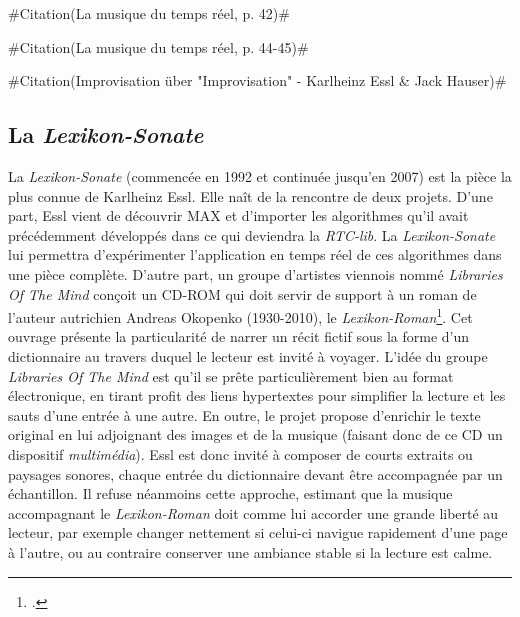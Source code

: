 \documentclass[a4paper,12pt]{article}
\newcommand{\zitat}[2]{\#Citation(#2)\#}
\begin{document}
\zitat{En musique, on parle de temps réel à partir du moment où le laps de temps entre le début du calcul et la livraison du résultat d'une opération informatique est suffisamment bref pour ne pas être perçu.}
{La musique du temps réel, p. 42}

\zitat{Le grand avantage du temps réel, ce n'est pas un gain de temps pour le compositeur --- au contraire cela représente une difficulté supplémentaire à maîtriser --- mais c'est qu'il intègre l'interprétation dans la musique électronique ; auparavant ces deux domaines restaient étrangers l'un à l'autre.}
{La musique du temps réel, p. 44-45}

\zitat{Weil man sich beim Improvisieren nicht (wie beim Komponieren) "out of time" befindet, sondern mitten im Zeitablauf steckt, entstehen aus dieser Verantwortung und aus diesem Zwang heraus Situationen, die man als Komponist am Schreibtisch nicht planen kann.}
{Improvisation über "Improvisation" - Karlheinz Essl \& Jack Hauser}


\subsection{La \emph{Lexikon-Sonate}}

La \emph{Lexikon-Sonate} (commencée en 1992 et continuée jusqu'en 2007) est la pièce la plus connue de Karlheinz Essl. Elle naît de la rencontre de deux projets. D'une part, Essl vient de découvrir MAX et d'importer les algorithmes qu'il avait précédemment développés dans ce qui deviendra la \emph{RTC-lib}. La \emph{Lexikon-Sonate} lui permettra d'expérimenter l'application en temps réel de ces algorithmes dans une pièce complète. D'autre part, un groupe d'artistes viennois nommé \emph{Libraries Of The Mind} conçoit un CD-ROM qui doit servir de support à un roman de l'auteur autrichien Andreas Okopenko (1930-2010), le \emph{Lexikon-Roman}\footnote{\cite{okopenko1983lexikon}.}. Cet ouvrage présente la particularité de narrer un récit fictif sous la forme d'un dictionnaire au travers duquel le lecteur est invité à voyager. L'idée du groupe \emph{Libraries Of The Mind} est qu'il se prête particulièrement bien au format électronique, en tirant profit des liens hypertextes pour simplifier la lecture et les sauts d'une entrée à une autre. En outre, le projet propose d'enrichir le texte original en lui adjoignant des images et de la musique (faisant donc de ce CD un dispositif \emph{multimédia}). Essl est donc invité à composer de courts extraits ou paysages sonores, chaque entrée du dictionnaire devant être accompagnée par un échantillon. Il refuse néanmoins cette approche, estimant que la musique accompagnant le \emph{Lexikon-Roman} doit comme lui accorder une grande liberté au lecteur, par exemple changer nettement si celui-ci navigue rapidement d'une page à l'autre, ou au contraire conserver une ambiance stable si la lecture est calme.
\end{document}

